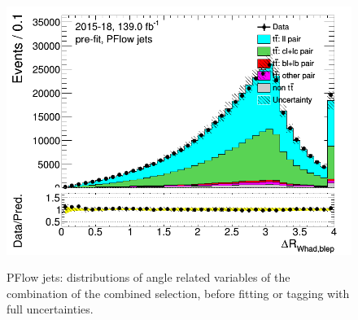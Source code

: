 \begin{figure}[H]
	\includegraphics[width=.45\textwidth]{FTAG_plots/pretagNoRwwithhighpTPFlowall/DataMC_h_dRWhadblep.png} \\
	\caption{PFlow jets: distributions of angle related variables of the combination of the combined selection,
	 before fitting or 
	tagging with full uncertainties.} \label{fig:combined_angles_PFlow}
	\end{figure}
	
